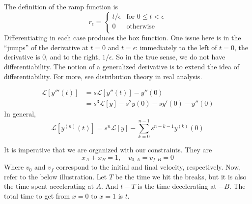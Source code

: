 \documentclass[a4paper]{article}
\begin{document}
The definition of the ramp function is
\[
	r_{\epsilon} = \begin{cases}
		t / \epsilon & \text{for } 0 \le t < \epsilon \\
		0 & \text{otherwise} \\
	\end{cases} 
\]
Differentiating in each case produces the box function. One issue here is in the ``jumps'' of the derivative at \( t = 0 \) and \( t = \epsilon \): immediately to the left of \( t = 0 \), the derivative is 0, and to the right, \( 1 / \epsilon \). So in the true sense, we do not have differentiability. The notion of a generalized derivative is to extend the idea of differentiability. For more, see distribution theory in real analysis.

\vspace{12pt}


\begin{align*}
	\mathcal{L}\!\left[ y'''\!\left( t \right) \right] & = s \mathcal{L}\!\left[ y''\!\left( t \right) \right] - y''\!\left( 0 \right) \\
	 & = s^{3}\mathcal{L}\!\left[ y \right] - s^{2}y \!\left( 0 \right) - sy'\!\left( 0 \right) - y''\!\left( 0 \right)
\end{align*}
In general,
\[
	\mathcal{L}\!\left[ y^{\!\left( n \right)}\!\left( t \right) \right] = s^{n}\mathcal{L}\!\left[ y \right] - \sum^{n - 1}_{k = 0} s^{n - k - 1}y^{\!\left( k \right)}\!\left( 0 \right) 
\]


It is imperative that we are organized with our constraints. They are
\[
	x_{A} + x_{B} = 1, \quad v_{0,A} = v_{f,B} = 0 
\]
Where \( v_{0} \) and \( v_{f} \) correspond to the initial and final velocity, respectively. Now, refer to the below illustration. Let \( T \) be the time we hit the breaks, but it is also the time spent accelerating at \( A \). And \( t - T \) is the time decelerating at \( -B \). The total time to get from \( x = 0 \) to \( x = 1 \) is \( t \).
\end{document}
